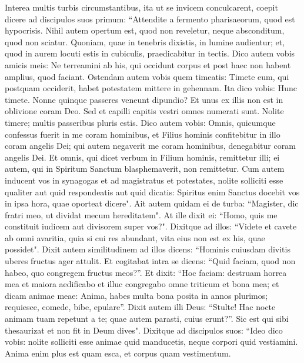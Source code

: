 \begin{biblechapter}  
\verse Interea multis turbis circumstantibus, ita ut se invicem conculcarent, coepit dicere ad discipulos suos primum: “Attendite a fermento pharisaeorum, quod est hypocrisis. 
\verse Nihil autem opertum est, quod non reveletur, neque absconditum, quod non sciatur. 
\verse Quoniam, quae in tenebris dixistis, in lumine audientur; et, quod in aurem locuti estis in cubiculis, praedicabitur in tectis. 
\verse Dico autem vobis amicis meis: Ne terreamini ab his, qui occidunt corpus et post haec non habent amplius, quod faciant. 
\verse Ostendam autem vobis quem timeatis: Timete eum, qui postquam occiderit, habet potestatem mittere in gehennam. Ita dico vobis: Hunc timete. 
\verse Nonne quinque passeres veneunt dipundio? Et unus ex illis non est in oblivione coram Deo. 
\verse Sed et capilli capitis vestri omnes numerati sunt. Nolite timere; multis passeribus pluris estis. 
\verse Dico autem vobis: Omnis, quicumque confessus fuerit in me coram hominibus, et Filius hominis confitebitur in illo coram angelis Dei; 
\verse qui autem negaverit me coram hominibus, denegabitur coram angelis Dei. 
\verse Et omnis, qui dicet verbum in Filium hominis, remittetur illi; ei autem, qui in Spiritum Sanctum blasphemaverit, non remittetur. 
\verse Cum autem inducent vos in synagogas et ad magistratus et potestates, nolite solliciti esse qualiter aut quid respondeatis aut quid dicatis: 
\verse Spiritus enim Sanctus docebit vos in ipsa hora, quae oporteat dicere". 
\verse Ait autem quidam ei de turba: “Magister, dic fratri meo, ut dividat mecum hereditatem". 
\verse At ille dixit ei: “Homo, quis me constituit iudicem aut divisorem super vos?". 
\verse Dixitque ad illos: “Videte et cavete ab omni avaritia, quia si cui res abundant, vita eius non est ex his, quae possidet". 
\verse Dixit autem similitudinem ad illos dicens: “Hominis cuiusdam divitis uberes fructus ager attulit. 
\verse Et cogitabat intra se dicens: “Quid faciam, quod non habeo, quo congregem fructus meos?”. 
\verse Et dixit: “Hoc faciam: destruam horrea mea et maiora aedificabo et illuc congregabo omne triticum et bona mea; 
\verse et dicam animae meae: Anima, habes multa bona posita in annos plurimos; requiesce, comede, bibe, epulare”. 
\verse Dixit autem illi Deus: “Stulte! Hac nocte animam tuam repetunt a te; quae autem parasti, cuius erunt?”.  
\verse Sic est qui sibi thesaurizat et non fit in Deum dives". 
\verse Dixitque ad discipulos suos: “Ideo dico vobis: nolite solliciti esse animae quid manducetis, neque corpori quid vestiamini. 
\verse Anima enim plus est quam esca, et corpus quam vestimentum. 

\end{biblechapter}
